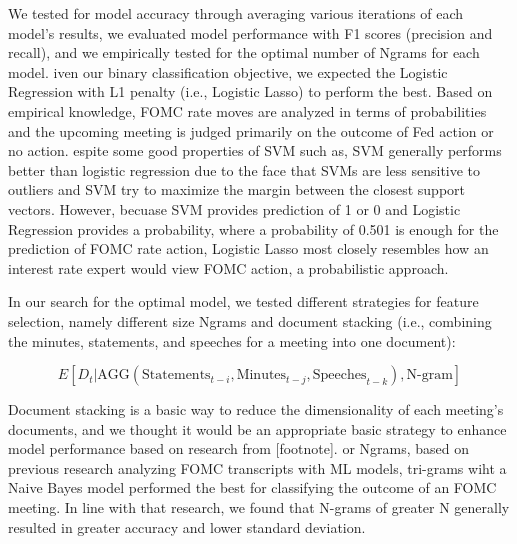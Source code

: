 \documentclass[11pt]{article}
\newcommand{\vertSpace}[1]{\vspace{3mm}}
\begin{document}
We tested for model accuracy through averaging various iterations of each model's results, we evaluated model performance with F1 scores (precision and recall), and we empirically tested for the optimal number of Ngrams for each model.  \vertSpace

Given our binary classification objective, we expected the Logistic Regression with L1 penalty (i.e., Logistic Lasso) to perform the best.  Based on empirical knowledge, FOMC rate moves are analyzed in terms of probabilities and the upcoming meeting is judged primarily on the outcome of Fed action or no action.  \vertSpace

Despite some good properties of SVM such as, SVM generally performs better than logistic regression due to the face that SVMs are less sensitive to outliers and SVM try to maximize the margin between the closest support vectors. However, becuase SVM provides prediction of 1 or 0 and Logistic Regression provides a probability, where a probability of 0.501 is enough for the prediction of FOMC rate action, Logistic Lasso most closely resembles how an interest rate expert would view FOMC action, a probabilistic approach.  \vertSpace


\subsubsection{Feature Choice}

In our search for the optimal model, we tested different strategies for feature selection, namely different size Ngrams and document stacking (i.e., combining the minutes, statements, and speeches for a meeting into one document):

$$E[D_t | \mbox{AGG}(\mbox{Statements}_{t-i}, \mbox{Minutes}_{t-j} , \mbox{Speeches}_{t-k}), \mbox{N-gram}]$$

Document stacking is a basic way to reduce the dimensionality of each meeting's documents, and we thought it would be an appropriate basic strategy to enhance model performance based on research from [footnote]. \vertSpace 

For Ngrams, based on previous research analyzing FOMC transcripts \cite{stanford} with ML models, tri-grams wiht a Naive Bayes model performed the best for classifying the outcome of an FOMC meeting.  In line with that research, we found that N-grams of greater N generally resulted in greater accuracy and lower standard deviation.  \vertSpace


\subsection{Model Performance and Results}
\end{document}
